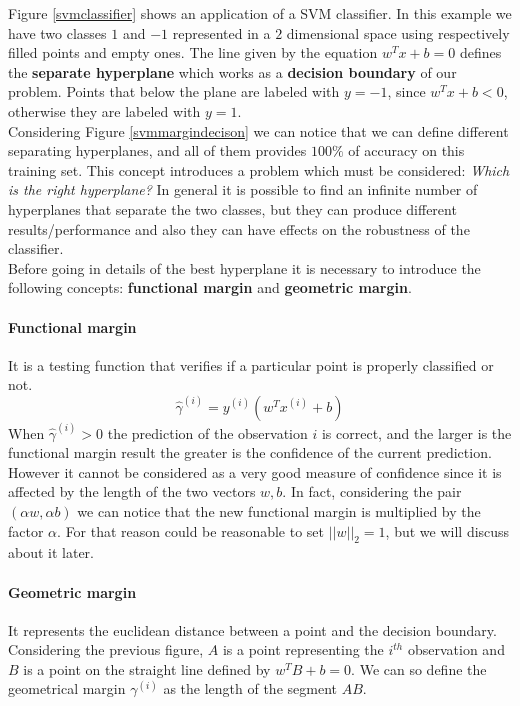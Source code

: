 Figure \ref{svmclassifier} shows an application of a SVM classifier. In this example we have two classes $1$ and $-1$ represented in a $2$ dimensional space using respectively filled points and empty ones. The line given by the equation $w^Tx + b = 0$ defines the \textbf{separate hyperplane} which works as a \textbf{decision boundary} of our problem. Points that below the plane are labeled with $y = -1$, since $w^Tx+b < 0$, otherwise they are labeled with $y = 1$.\\

Considering Figure \ref{svmmargindecison} we can notice that we can define different separating hyperplanes, and all of them provides $100\%$ of accuracy on this training set. This concept introduces a problem which must be considered: \textit{Which is the right hyperplane?} In general it is possible to find an infinite number of hyperplanes that separate the two classes, but they can produce different results/performance and also they can have effects on the robustness of the classifier.\\
Before going in details of the best hyperplane it is necessary to introduce the following concepts: \textbf{functional margin} and \textbf{geometric margin}.

\paragraph{Functional margin} It is a testing function that verifies if a particular point is properly classified or not.
$$\hat{\gamma}^{(i)} = y^{(i)}(w^Tx^{(i)} + b)$$
When $\hat{\gamma}^{(i)} > 0$ the prediction of the observation $i$ is correct, and the larger is the functional margin result the greater is the confidence of the current prediction. However it cannot be considered as a very good measure of confidence since it is affected by the length of the two vectors $w, b$. In fact, considering the pair $(\alpha w, \alpha b)$ we can notice that the new functional margin is multiplied by the factor $\alpha$. For that reason could be reasonable to set $||w||_2 = 1$, but we will discuss about it later.


\paragraph{Geometric margin} It represents the euclidean distance between a point and the decision boundary.
Considering the previous figure, $A$ is a point representing the $i^{th}$ observation and $B$ is a point on the straight line defined by $w^TB+b = 0$. We can so define the geometrical margin $\gamma^{(i)}$ as the length of the segment $AB$. \\

